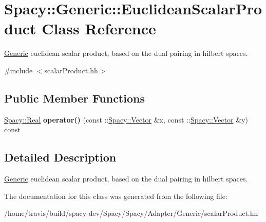 \hypertarget{classSpacy_1_1Generic_1_1EuclideanScalarProduct}{\section{Spacy\-:\-:Generic\-:\-:Euclidean\-Scalar\-Product Class Reference}
\label{classSpacy_1_1Generic_1_1EuclideanScalarProduct}
}


\hyperlink{namespaceSpacy_1_1Generic}{Generic} euclidean scalar product, based on the dual pairing in hilbert spaces.  




{\ttfamily \#include $<$scalar\-Product.\-hh$>$}

\subsection*{Public Member Functions}
\begin{DoxyCompactItemize}
\item 
\hypertarget{classSpacy_1_1Generic_1_1EuclideanScalarProduct_a7aa8a7d9b912b0a72386317435897f81}{\hyperlink{classSpacy_1_1Real}{Spacy\-::\-Real} {\bfseries operator()} (const \-::\hyperlink{classSpacy_1_1Vector}{Spacy\-::\-Vector} \&x, const \-::\hyperlink{classSpacy_1_1Vector}{Spacy\-::\-Vector} \&y) const }\label{classSpacy_1_1Generic_1_1EuclideanScalarProduct_a7aa8a7d9b912b0a72386317435897f81}

\end{DoxyCompactItemize}


\subsection{Detailed Description}
\hyperlink{namespaceSpacy_1_1Generic}{Generic} euclidean scalar product, based on the dual pairing in hilbert spaces. 

The documentation for this class was generated from the following file\-:\begin{DoxyCompactItemize}
\item 
/home/travis/build/spacy-\/dev/\-Spacy/\-Spacy/\-Adapter/\-Generic/scalar\-Product.\-hh\end{DoxyCompactItemize}
